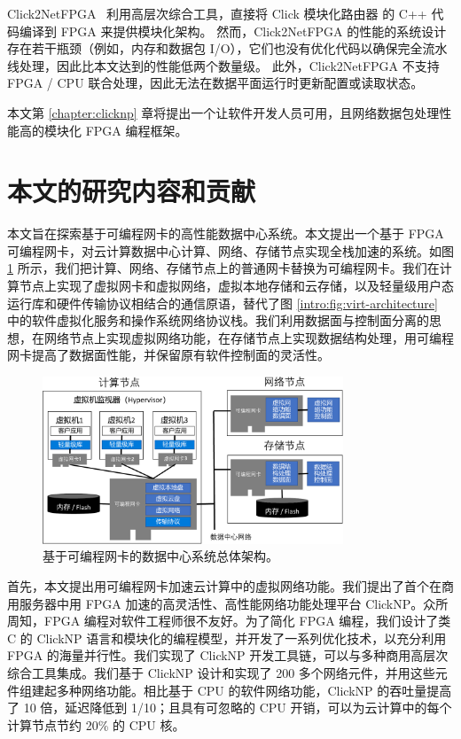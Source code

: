 Click2NetFPGA~\cite {Click2NetFPGA} 利用高层次综合工具，直接将 Click 模块化路由器 \cite {kohler2000click} 的 C++ 代码编译到 FPGA 来提供模块化架构。
然而，Click2NetFPGA 的性能的系统设计存在若干瓶颈（例如，内存和数据包 I/O），它们也没有优化代码以确保完全流水线处理，因此比本文达到的性能低两个数量级。
此外，Click2NetFPGA 不支持 FPGA / CPU 联合处理，因此无法在数据平面运行时更新配置或读取状态。

本文第 \ref{chapter:clicknp} 章将提出一个让软件开发人员可用，且网络数据包处理性能高的模块化 FPGA 编程框架。









\section{本文的研究内容和贡献}


本文旨在探索基于可编程网卡的高性能数据中心系统。本文提出一个基于 FPGA 可编程网卡，对云计算数据中心计算、网络、存储节点实现全栈加速的系统。如图 \ref{intro:fig:accel-arch} 所示，我们把计算、网络、存储节点上的普通网卡替换为可编程网卡。我们在计算节点上实现了虚拟网卡和虚拟网络，虚拟本地存储和云存储，以及轻量级用户态运行库和硬件传输协议相结合的通信原语，替代了图 \ref{intro:fig:virt-architecture} 中的软件虚拟化服务和操作系统网络协议栈。我们利用数据面与控制面分离的思想，在网络节点上实现虚拟网络功能，在存储节点上实现数据结构处理，用可编程网卡提高了数据面性能，并保留原有软件控制面的灵活性。


\begin{figure}[htbp]
	\centering
	\includegraphics[width=0.8\textwidth]{figures/accel_arch.pdf}
	\caption{基于可编程网卡的数据中心系统总体架构。}
	\label{intro:fig:accel-arch}
\end{figure}

首先，本文提出用可编程网卡加速云计算中的虚拟网络功能。我们提出了首个在商用服务器中用 FPGA 加速的高灵活性、高性能网络功能处理平台 ClickNP。众所周知，FPGA 编程对软件工程师很不友好。为了简化 FPGA 编程，我们设计了类 C 的 ClickNP 语言和模块化的编程模型，并开发了一系列优化技术，以充分利用 FPGA 的海量并行性。我们实现了 ClickNP 开发工具链，可以与多种商用高层次综合工具集成。我们基于 ClickNP 设计和实现了 200 多个网络元件，并用这些元件组建起多种网络功能。相比基于 CPU 的软件网络功能，ClickNP 的吞吐量提高了 10 倍，延迟降低到 1/10；且具有可忽略的 CPU 开销，可以为云计算中的每个计算节点节约 20\% 的 CPU 核。

